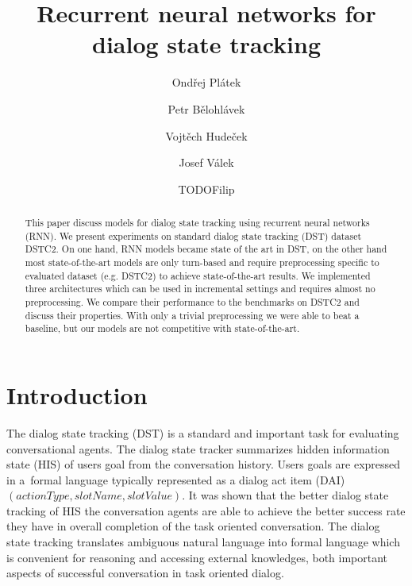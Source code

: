 \documentclass{itatnew}
\begin{document}
\title{Recurrent neural networks for dialog state tracking}

\author{Ondřej Plátek \and Petr Bělohlávek \and Vojtěch Hudeček \and
Josef Válek \and TODOFilip}


\maketitle              %

\begin{abstract}
This paper discuss models for dialog state tracking using recurrent neural networks (RNN).
We present experiments on standard dialog state tracking (DST) dataset DSTC2\cite{todo}.
On one hand, RNN models became state of the art in DST,
on the other hand most state-of-the-art models are only turn-based and require preprocessing specific to evaluated dataset (e.g. DSTC2) to achieve state-of-the-art results.
We implemented three architectures which can be used in incremental settings and requires almost no preprocessing.
We compare their performance to the benchmarks on DSTC2 and discuss their properties.
With only a trivial preprocessing we were able to beat a baseline, but our models are not competitive with state-of-the-art.
\end{abstract}
%
\section{Introduction}
%
The dialog state tracking (DST) is a standard and important task for evaluating conversational agents\cite{dstc1, dstc2, dstc3, HIS model}.
The dialog state tracker summarizes hidden information state (HIS) \cite{todo} of users goal from the conversation history.
Users goals are expressed in a~formal language typically represented as a dialog act item (DAI) $(actionType, slotName, slotValue)$.
It was shown that the better dialog state tracking of HIS the conversation agents are able to achieve the better success rate they have in overall completion of the task oriented conversation.\cite{Steve Yound, Henderson,..Zilka, Alex}
The dialog state tracking translates ambiguous natural language into formal language which is convenient for reasoning and accessing external knowledges, both important aspects of successful conversation in task oriented dialog.
\end{document}
